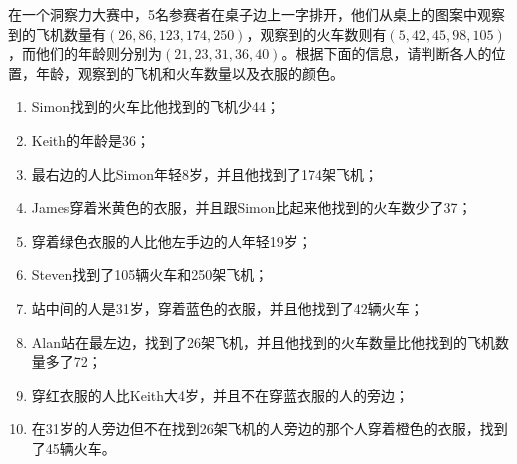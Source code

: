 \begin{example}[找火车]
  在一个洞察力大赛中，5名参赛者在桌子边上一字排开，他们从桌上的图案中观察到的飞机数量有$(26,86,123,174,250)$，观察到的火车数则有$(5,42,45,98,105)$，而他们的年龄则分别为$(21,23,31,36,40)$。根据下面的信息，请判断各人的位置，年龄，观察到的飞机和火车数量以及衣服的颜色。
  \begin{enumerate}
  \item Simon找到的火车比他找到的飞机少44；
  \item Keith的年龄是36；
  \item 最右边的人比Simon年轻8岁，并且他找到了174架飞机；
  \item James穿着米黄色的衣服，并且跟Simon比起来他找到的火车数少了37；
  \item 穿着绿色衣服的人比他左手边的人年轻19岁；
  \item Steven找到了105辆火车和250架飞机；
  \item 站中间的人是31岁，穿着蓝色的衣服，并且他找到了42辆火车；
  \item Alan站在最左边，找到了26架飞机，并且他找到的火车数量比他找到的飞机数量多了72；
  \item 穿红衣服的人比Keith大4岁，并且不在穿蓝衣服的人的旁边；
  \item 在31岁的人旁边但不在找到26架飞机的人旁边的那个人穿着橙色的衣服，找到了45辆火车。
  \end{enumerate}
\end{example}
